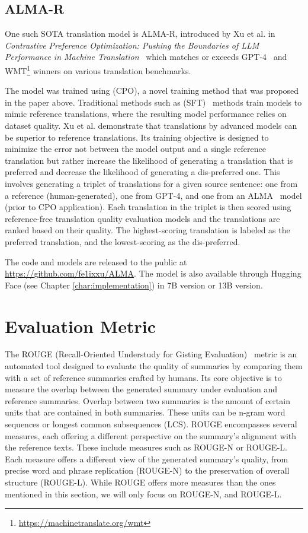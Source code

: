 \documentclass[english, ba, kiv, he, iso690numb, pdf, viewonly]{fasthesis}
\begin{document}
\subsection{ALMA-R}
One such SOTA translation model is ALMA-R, introduced by Xu et al. in \textit{Contrastive Preference Optimization: Pushing the Boundaries of LLM Performance in Machine Translation}~\cite{xu2024contrastive} which matches or exceeds GPT-4~\cite{openai2024gpt4} and WMT\footnote{\url{https://machinetranslate.org/wmt}} winners on various translation benchmarks. 

The model was trained using  (CPO), a novel training method that was proposed in the paper above. Traditional methods such as  (SFT)~\cite{goodfellow2016deep} methods train models to mimic reference translations, where the resulting model performance relies on dataset quality. Xu et al. demonstrate that translations by advanced models can be superior to reference translations. Its training objective is designed to minimize the error not between the model output and a single reference translation but rather increase the likelihood of generating a translation that is preferred and decrease the likelihood of generating a dis-preferred one. This involves generating a triplet of translations for a given source sentence: one from a reference (human-generated), one from GPT-4, and one from an ALMA~\cite{xu2024paradigm} model (prior to CPO application). Each translation in the triplet is then scored using reference-free translation quality evaluation models and the translations are ranked based on their quality. The highest-scoring translation is labeled as the preferred translation, and the lowest-scoring as the dis-preferred. 

The code and models are released to the public at \url{https://github.com/fe1ixxu/ALMA}. The model is also available through Hugging Face (see Chapter \ref{char:implementation}) in 7B version or 13B version.

\section{Evaluation Metric}
The ROUGE (Recall-Oriented Understudy for Gisting Evaluation)~\cite{lin-2004-rouge} metric is an automated tool designed to evaluate the quality of summaries by comparing them with a set of reference summaries crafted by humans. Its core objective is to measure the overlap between the generated summary under evaluation and reference summaries. Overlap between two summaries is the amount of certain units that are contained in both summaries. These units can be n-gram word sequences or longest common subsequences (LCS).
ROUGE encompasses several measures, each offering a different perspective on the summary's alignment with the reference texts. These include measures such as ROUGE-N or ROUGE-L. Each measure offers a different view of the generated summary's quality, from precise word and phrase replication (ROUGE-N) to the preservation of overall structure (ROUGE-L). While ROUGE offers more measures than the ones mentioned in this section, we will only focus on ROUGE-N, and ROUGE-L.
\end{document}

